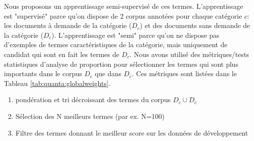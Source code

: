  Nous proposons un apprentissage semi-supervisé de ces termes. L'apprentissage est "supervisé" parce qu'on dispose de 2 corpus annotées pour chaque catégorie $c$: les documents à demande de la catégorie ($D_c$) et des documents sans demande de la catégorie ($D_{\overline{c}}$). L'apprentissage est "semi" parce qu'on ne dispose pas d'exemples de termes caractéristiques de la catégorie, mais uniquement de candidat qui sont en fait les termes de $D_c$. Nous avons utilisé des métriques/tests statistiques d'analyse de proportion pour sélectionner les termes qui sont plus importants dans le corpus $D_c$ que dans $D_{\overline{c}}$. Ces métriques sont listées dans le Tableau \ref{tab:quanta:globalweights}.
 
 \begin{enumerate}
 	\item  pondération et tri décroissant des termes du corpus $D_c \cup D_{\overline{c}}$
 	\item  Sélection des N meilleurs termes (par ex. N=100)
 	\item Filtre des termes donnant le meilleur score sur les données de développement
 \end{enumerate}





